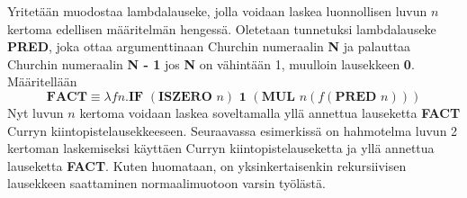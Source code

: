 Yritetään muodostaa lambdalauseke, jolla voidaan laskea luonnollisen luvun $n$ kertoma edellisen määritelmän hengessä. Oletetaan tunnetuksi lambdalauseke \textbf{PRED}, joka ottaa argumenttinaan Churchin numeraalin \textbf{N} ja palauttaa Churchin numeraalin \textbf{N - 1} jos \textbf{N} on vähintään 1, muulloin lausekkeen \textbf{0}. Määritellään
\[ \textbf{FACT} \equiv \lambda f n. \textbf{IF } (\textbf{ISZERO } n) \textbf{ 1 } (\textbf{MUL } n (f (\textbf{PRED } n))) \]
Nyt luvun $n$ kertoma voidaan laskea soveltamalla yllä annettua lauseketta \textbf{FACT} Curryn kiintopistelausekkeeseen. Seuraavassa esimerkissä on hahmotelma luvun 2 kertoman laskemiseksi käyttäen Curryn kiintopistelauseketta ja yllä annettua lauseketta \textbf{FACT}. Kuten huomataan, on yksinkertaisenkin rekursiivisen lausekkeen saattaminen normaalimuotoon varsin työlästä.  

